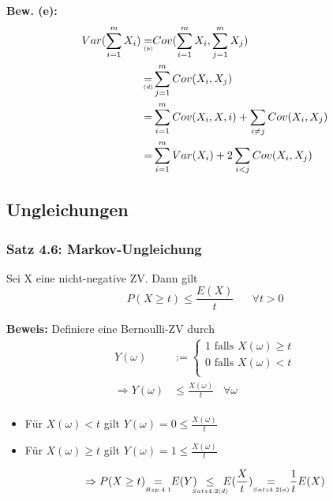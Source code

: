 \documentclass[a4paper,11pt]{article}
\begin{document}
\noindent\textbf{Bew. (e):}
\begin{align*}
    Var(\sum_{i=1}^{m}X_i) \underset{\mathclap{\scriptscriptstyle (b)}}{=}& Cov(\sum_{i=1}^{m}X_i,\sum_{j=1}^{m}X_j)\\
    \underset{\mathclap{\scriptscriptstyle (d)}}{=}& \sum_{j=1}^{m} Cov(X_i,X_j) \\
    =& \sum_{i=1}^{m} Cov(X_i,X,i) + \sum_{i\neq j} Cov(X_i,X_j) \\
    =& \sum_{i=1}^{m} Var(X_i)+2\sum_{i<j}Cov(X_i,X_j)\\
\end{align*}

\subsection{Ungleichungen}

\subsubsection{Satz 4.6: Markov-Ungleichung}
Sei X eine nicht-negative ZV. Dann gilt 
\[P(X\geq t) \leq \frac{E(X)}{t} \hspace{20pt}\forall t>0\]

\noindent\textbf{Beweis:}
Definiere eine Bernoulli-ZV durch
\begin{align*}
Y(\omega) &:= \begin{cases}
1 \text{ falls } X(\omega) \geq t\\
0 \text{ falls } X(\omega) < t\\
\end{cases}\\
\Rightarrow Y(\omega) &\leq \frac{X(\omega)}{t} \hspace{10pt}\forall \omega\\
\end{align*}
\begin{itemize}
\item Für $X(\omega) < t$ gilt $Y(\omega)=0\leq\frac{X(\omega)}{t}$
\item Für $X(\omega) \geq t$ gilt $Y(\omega)=1\leq\frac{X(\omega)}{t}$
\end{itemize}
\[\Rightarrow P(X\geq t) \hspace{5pt}\underset{\mathclap{\scriptscriptstyle Bsp. 4.1}}{=}\hspace{5pt} E(Y) \hspace{5pt}\underset{\mathclap{\scriptscriptstyle Satz 4.2(d)}}{\leq}\hspace{5pt} E(\frac{X}{t}) \hspace{10pt}\underset{\mathclap{\scriptscriptstyle Satz 4.2(a)}}{=}\hspace{10pt} \frac{1}{t}E(X)\]
\end{document}
